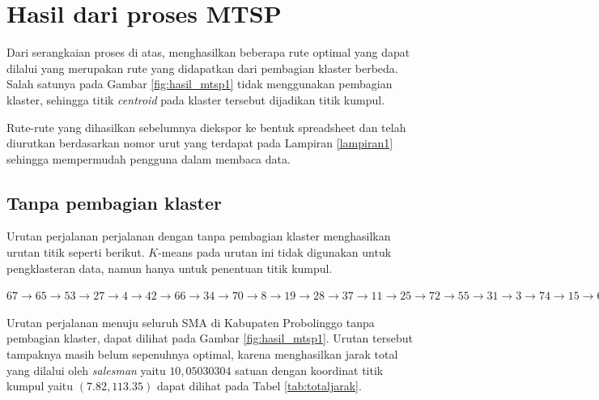 \section{Hasil dari proses MTSP}

Dari serangkaian proses di atas, menghasilkan beberapa rute optimal yang dapat dilalui yang merupakan rute yang didapatkan dari pembagian klaster berbeda. Salah satunya pada Gambar \ref{fig:hasil_mtsp1} tidak menggunakan pembagian klaster, sehingga titik \textit{centroid} pada klaster tersebut dijadikan titik kumpul.

Rute-rute yang dihasilkan sebelumnya diekspor ke bentuk spreadsheet dan telah diurutkan berdasarkan nomor urut yang terdapat pada Lampiran \ref{lampiran1} sehingga mempermudah pengguna dalam membaca data.

\subsection{Tanpa pembagian klaster}

Urutan perjalanan perjalanan dengan tanpa pembagian klaster menghasilkan urutan titik seperti berikut. $K$-means pada urutan ini tidak digunakan untuk pengklasteran data, namun hanya untuk penentuan titik kumpul.

$67\rightarrow65\rightarrow53\rightarrow27\rightarrow4\rightarrow42\rightarrow66\rightarrow34\rightarrow70\rightarrow8\rightarrow19\rightarrow28\rightarrow37\rightarrow11\rightarrow25\rightarrow72\rightarrow55\rightarrow31\rightarrow3\rightarrow74\rightarrow15\rightarrow68\rightarrow20\rightarrow44\rightarrow40\rightarrow16\rightarrow30\rightarrow23\rightarrow24\rightarrow63\rightarrow13\rightarrow29\rightarrow50\rightarrow7\rightarrow54\rightarrow2\rightarrow10\rightarrow52\rightarrow64\rightarrow21\rightarrow62\rightarrow58\rightarrow26\rightarrow1\rightarrow69\rightarrow14\rightarrow45\rightarrow61\rightarrow38\rightarrow59\rightarrow17\rightarrow71\rightarrow18\rightarrow32\rightarrow57\rightarrow73\rightarrow75\rightarrow41\rightarrow39\rightarrow49\rightarrow51\rightarrow6\rightarrow60\rightarrow22\rightarrow33\rightarrow48\rightarrow5\rightarrow35\rightarrow46\rightarrow56\rightarrow36\rightarrow47\rightarrow9\rightarrow12\rightarrow43$

Urutan perjalanan menuju seluruh SMA di Kabupaten Probolinggo tanpa pembagian klaster, dapat dilihat pada Gambar \ref{fig:hasil_mtsp1}. Urutan tersebut tampaknya masih belum sepenuhnya optimal, karena menghasilkan jarak total yang dilalui oleh \textit{salesman} yaitu $10,05030304$ satuan dengan koordinat titik kumpul yaitu $(7.82, 113.35)$ dapat dilihat pada Tabel \ref{tab:totaljarak}.

